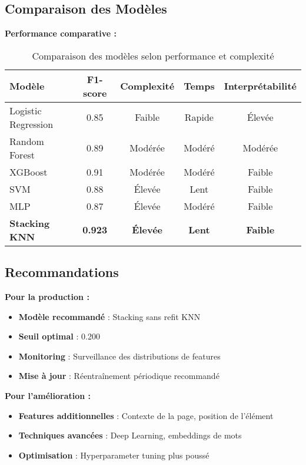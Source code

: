 \documentclass[12pt,a4paper]{article}
\begin{document}
\subsection{Comparaison des Modèles}

\textbf{Performance comparative :}
\begin{table}[H]
\centering
\begin{tabular}{|l|c|c|c|c|}
\hline
\textbf{Modèle} & \textbf{F1-score} & \textbf{Complexité} & \textbf{Temps} & \textbf{Interprétabilité} \\
\hline
Logistic Regression & 0.85 & Faible & Rapide & Élevée \\
Random Forest & 0.89 & Modérée & Modéré & Modérée \\
XGBoost & 0.91 & Modérée & Modéré & Faible \\
SVM & 0.88 & Élevée & Lent & Faible \\
MLP & 0.87 & Élevée & Modéré & Faible \\
\hline
\textbf{Stacking KNN} & \textbf{0.923} & \textbf{Élevée} & \textbf{Lent} & \textbf{Faible} \\
\hline
\end{tabular}
\caption{Comparaison des modèles selon performance et complexité}
\end{table}

\subsection{Recommandations}

\textbf{Pour la production :}
\begin{itemize}
    \item \textbf{Modèle recommandé} : Stacking sans refit KNN
    \item \textbf{Seuil optimal} : 0.200
    \item \textbf{Monitoring} : Surveillance des distributions de features
    \item \textbf{Mise à jour} : Réentraînement périodique recommandé
\end{itemize}

\textbf{Pour l'amélioration :}
\begin{itemize}
    \item \textbf{Features additionnelles} : Contexte de la page, position de l'élément
    \item \textbf{Techniques avancées} : Deep Learning, embeddings de mots
    \item \textbf{Optimisation} : Hyperparameter tuning plus poussé
\end{itemize}
\end{document}
